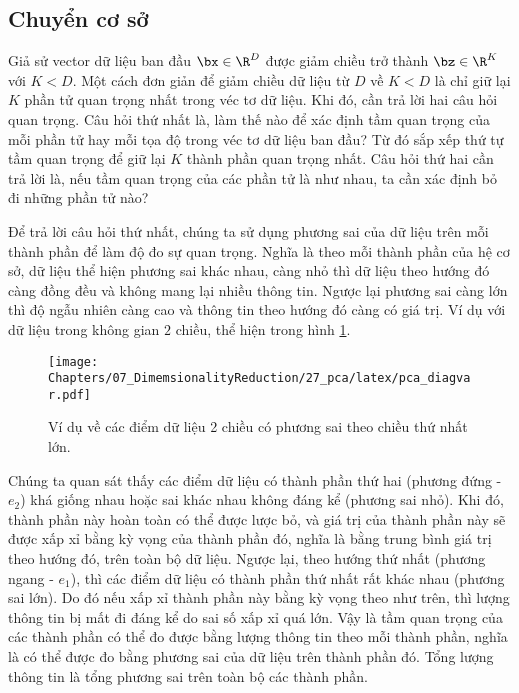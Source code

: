 \subsection{Chuyển cơ sở}
Giả sử vector dữ liệu ban đầu $\bx \in \R^{D}$ được giảm chiều trở thành $\bz \in \R^K$ với $K < D$. Một cách đơn giản để giảm chiều dữ liệu từ $D$ về $K < D$ là chỉ giữ lại $K$ phần tử {quan trọng nhất} trong véc tơ dữ liệu. Khi đó, cần trả lời hai câu hỏi quan trọng. Câu hỏi thứ nhất là, làm thế nào để xác định {tầm quan trọng} của mỗi phần tử hay mỗi tọa độ trong véc tơ dữ liệu ban đầu? Từ đó sắp xếp thứ tự tầm quan trọng để giữ lại $K$ thành phần quan trọng nhất. Câu hỏi thứ hai cần trả lời là, nếu tầm quan trọng của các phần tử là như nhau, ta cần xác định bỏ đi những phần tử nào?

Để trả lời câu hỏi thứ nhất, chúng ta sử dụng phương sai của dữ liệu trên mỗi thành phần để làm độ đo sự quan trọng. Nghĩa là theo mỗi thành phần của hệ cơ sở, dữ liệu thể hiện phương sai khác nhau, càng nhỏ thì dữ liệu theo hướng đó càng đồng đều và không mang lại nhiều thông tin. Ngược lại phương sai càng lớn thì độ ngẫu nhiên càng cao và thông tin theo hướng đó càng có giá trị. Ví dụ với dữ liệu trong không gian $2$ chiều, thể hiện trong hình \ref{hinh1}. 

\begin{figure}[ht]
		\texttt{[image: Chapters/07\_DimemsionalityReduction/27\_pca/latex/pca\_diagvar.pdf]}
		\caption{Ví dụ về các điểm dữ liệu 2 chiều có phương sai theo chiều thứ nhất lớn.}
		\label{hinh1}

\end{figure}

Chúng ta quan sát thấy các điểm dữ liệu có thành phần thứ hai (phương đứng - $e_2$) khá giống nhau hoặc sai khác
nhau không đáng kể (phương sai nhỏ). Khi đó, thành phần này hoàn toàn có thể được lược bỏ, và giá trị của thành phần này sẽ được xấp xỉ bằng kỳ vọng của thành phần đó, nghĩa là bằng trung bình giá trị theo hướng đó, trên toàn bộ dữ liệu. Ngược lại, theo hướng thứ nhất (phương ngang - $e_1$), thì các điểm dữ liệu có thành phần thứ nhất rất khác nhau (phương sai lớn). Do đó nếu xấp xỉ thành phần này bằng kỳ vọng theo như trên, thì {lượng thông tin} bị mất đi đáng kể do sai số xấp xỉ quá lớn.  Vậy là tầm quan trọng của các thành phần có thể đo được bằng lượng thông tin theo mỗi thành phần, nghĩa là có thể được đo bằng phương sai của dữ liệu trên thành phần đó. Tổng lượng thông tin là tổng phương sai trên toàn bộ các thành phần. 

